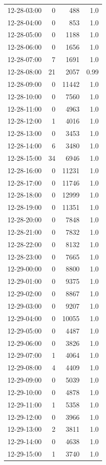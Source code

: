 \documentclass[11pt]{article}
\begin{document}
\begin{enumerate}
\begin{table}[htbp]
\begin{tabular}{rrrr}
12-28-03:00 & 0 & 488 & 1.0\\
12-28-04:00 & 0 & 853 & 1.0\\
12-28-05:00 & 0 & 1188 & 1.0\\
12-28-06:00 & 0 & 1656 & 1.0\\
12-28-07:00 & 7 & 1691 & 1.0\\
12-28-08:00 & 21 & 2057 & 0.99\\
12-28-09:00 & 0 & 11442 & 1.0\\
12-28-10:00 & 0 & 7560 & 1.0\\
12-28-11:00 & 0 & 4963 & 1.0\\
12-28-12:00 & 1 & 4016 & 1.0\\
12-28-13:00 & 0 & 3453 & 1.0\\
12-28-14:00 & 6 & 3480 & 1.0\\
12-28-15:00 & 34 & 6946 & 1.0\\
12-28-16:00 & 0 & 11231 & 1.0\\
12-28-17:00 & 0 & 11746 & 1.0\\
12-28-18:00 & 0 & 12999 & 1.0\\
12-28-19:00 & 0 & 11351 & 1.0\\
12-28-20:00 & 0 & 7848 & 1.0\\
12-28-21:00 & 0 & 7832 & 1.0\\
12-28-22:00 & 0 & 8132 & 1.0\\
12-28-23:00 & 0 & 7665 & 1.0\\
12-29-00:00 & 0 & 8800 & 1.0\\
12-29-01:00 & 0 & 9375 & 1.0\\
12-29-02:00 & 0 & 8867 & 1.0\\
12-29-03:00 & 0 & 9207 & 1.0\\
12-29-04:00 & 0 & 10055 & 1.0\\
12-29-05:00 & 0 & 4487 & 1.0\\
12-29-06:00 & 0 & 3826 & 1.0\\
12-29-07:00 & 1 & 4064 & 1.0\\
12-29-08:00 & 4 & 4409 & 1.0\\
12-29-09:00 & 0 & 5039 & 1.0\\
12-29-10:00 & 0 & 4878 & 1.0\\
12-29-11:00 & 1 & 5358 & 1.0\\
12-29-12:00 & 0 & 3966 & 1.0\\
12-29-13:00 & 2 & 3811 & 1.0\\
12-29-14:00 & 0 & 4638 & 1.0\\
12-29-15:00 & 1 & 3740 & 1.0\\

\end{tabular}
\end{table}
\end{enumerate}
\end{document}
